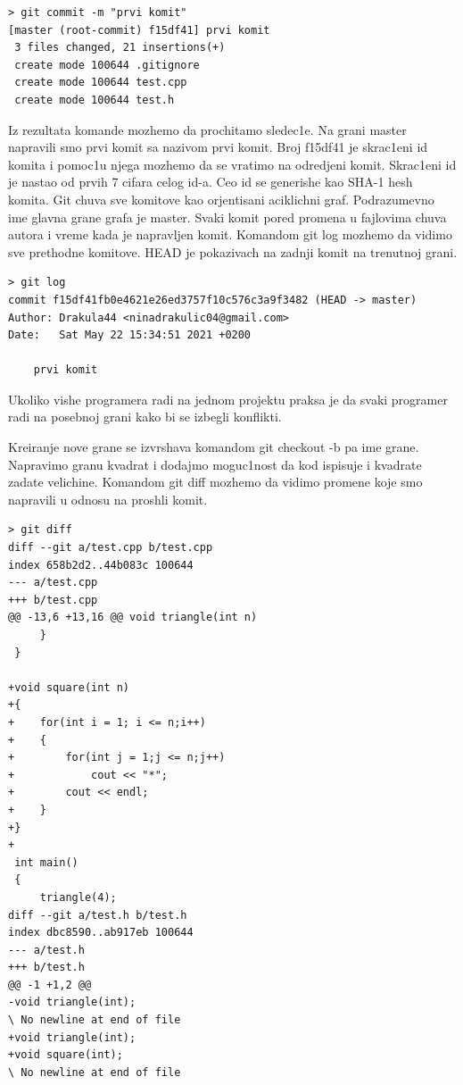 \documentclass[a4paper,fleqn,12pt]{JMThesis}
\newcommand{\latin}{\fontencoding{T1}\selectfont}
\theoremstyle{plain}
\theoremstyle{definition}
\newcounter{cpp}
\begin{document}
{\latin
\begin{center}
\begin{lstlisting}[caption={\latin git commit}]
> git commit -m "prvi komit"
[master (root-commit) f15df41] prvi komit
 3 files changed, 21 insertions(+)
 create mode 100644 .gitignore
 create mode 100644 test.cpp
 create mode 100644 test.h
\end{lstlisting}
\end{center}
}
Iz rezultata komande mozhemo da prochitamo sledec1e. 
Na grani {\latin master} napravili smo prvi komit sa nazivom prvi komit. 
Broj {\latin f15df41} je skrac1eni id komita i pomoc1u njega mozhemo da se vratimo na odredjeni komit. 
Skrac1eni id je nastao od prvih 7 cifara celog id-a.
Ceo id se generishe kao {\latin SHA-1} hesh komita.  
Git chuva sve komitove kao orjentisani aciklichni graf.
Podrazumevno ime glavna grane grafa je {\latin master}. 
Svaki komit pored promena u fajlovima chuva autora i vreme kada je napravljen komit. 
Komandom {\latin git log} mozhemo da vidimo sve prethodne komitove. {\latin HEAD} je pokazivach na zadnji komit na trenutnoj grani.
{\latin
\begin{center}
\begin{lstlisting}[caption={\latin git log}]
> git log
commit f15df41fb0e4621e26ed3757f10c576c3a9f3482 (HEAD -> master)
Author: Drakula44 <ninadrakulic04@gmail.com>
Date:   Sat May 22 15:34:51 2021 +0200

    prvi komit
\end{lstlisting}
\end{center}
}
Ukoliko vishe programera radi na jednom projektu praksa je da svaki programer radi na posebnoj grani kako bi se izbegli konflikti.\par
Kreiranje nove grane se izvrshava komandom {\latin git checkout -b} pa ime grane. Napravimo granu kvadrat i dodajmo moguc1nost da kod ispisuje i kvadrate zadate velichine. Komandom {\latin git diff} mozhemo da vidimo promene koje smo napravili u odnosu na proshli komit.

{\latin
\begin{center}
\begin{lstlisting}[caption={\latin git diff}]
> git diff
diff --git a/test.cpp b/test.cpp
index 658b2d2..44b083c 100644
--- a/test.cpp
+++ b/test.cpp
@@ -13,6 +13,16 @@ void triangle(int n)
     }
 }

+void square(int n)
+{
+    for(int i = 1; i <= n;i++)
+    {
+        for(int j = 1;j <= n;j++)
+            cout << "*";
+        cout << endl;
+    }
+}
+
 int main()
 {
     triangle(4);
diff --git a/test.h b/test.h
index dbc8590..ab917eb 100644
--- a/test.h
+++ b/test.h
@@ -1 +1,2 @@
-void triangle(int);
\ No newline at end of file
+void triangle(int);
+void square(int);
\ No newline at end of file
\end{lstlisting}
\end{center}
}
\end{document}
